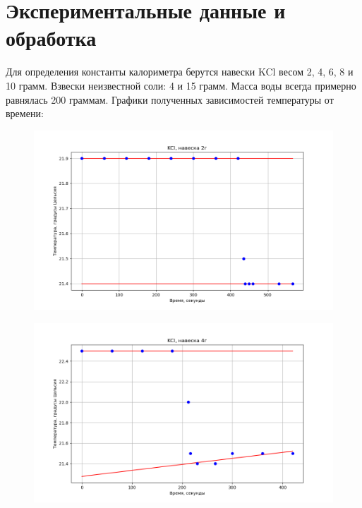 \documentclass[a4paper, 12pt]{article}
\begin{document}
\section{Экспериментальные данные и обработка}
Для определения константы калориметра берутся навески KCl весом 2, 4, 6, 8 и 10 грамм.
Взвески неизвестной соли: 4 и 15 грамм.
Масса воды всегда примерно равнялась 200 граммам.
Графики полученных зависимостей температуры от времени:
\begin{figure}[h!]
    \centering
    \includegraphics[width=150mm]{./pictures/1.png}
    \caption{}
\end{figure}
\begin{figure}[h!]
    \centering
    \includegraphics[width=150mm]{./pictures/2.png}
    \caption{}
\end{figure}

\newpage
\end{document}
